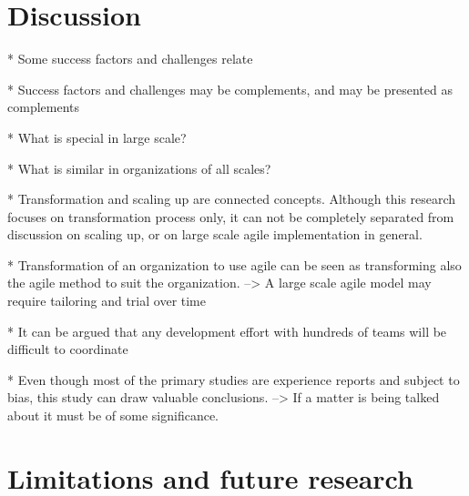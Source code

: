 \documentclass[preprint,authoryear,12pt]{elsarticle}
\begin{document}




\section{Discussion}
\label{sec:discussion}

* Some success factors and challenges relate

* Success factors and challenges may be complements, and may be presented as
  complements

* What is special in large scale?

* What is similar in organizations of all scales?

* Transformation and scaling up are connected concepts. Although this research
  focuses on transformation process only, it can not be completely separated
  from discussion on scaling up, or on large scale agile implementation in
  general.

* Transformation of an organization to use agile can be seen as transforming
  also the agile method to suit the organization.
  --> A large scale agile model may require tailoring and trial over time

* It can be argued that any development effort with hundreds of teams will be
  difficult to coordinate

* Even though most of the primary studies are experience reports and subject to
  bias, this study can draw valuable conclusions. --> If a matter is being
  talked about it must be of some significance.

\section{Limitations and future research}
\label{sec:conclusion}






\end{document}
